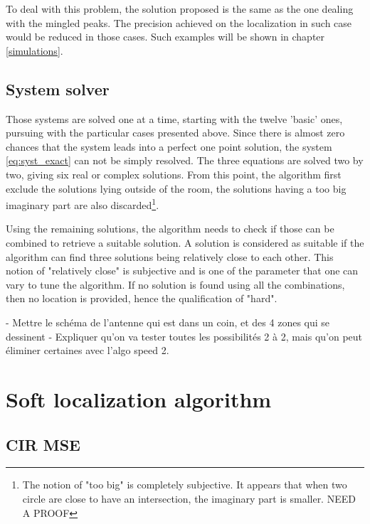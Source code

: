 To deal with this problem, the solution proposed is the same as the one dealing with the mingled peaks. The precision achieved on the localization in such case would be reduced  in those cases. Such examples will be shown in chapter \ref{simulations}.
\vspace{2mm}

\subsection{System solver}

Those systems are solved one at a time, starting with the twelve 'basic' ones, pursuing with the particular cases presented above. Since there is almost zero chances that the system leads into a perfect one point solution, the system \ref{eq:syst_exact} can not be simply resolved. The three equations are solved two by two, giving six real or complex solutions. From this point, the algorithm first exclude the solutions lying outside of the room, the solutions having a too big imaginary part are also discarded\footnote{The notion of "too big" is completely subjective. It appears that when two circle are close to have an intersection, the imaginary part is smaller. \color{red} NEED A PROOF \color{black}}. 
\vspace{2mm}

Using the remaining solutions, the algorithm needs to check if those can be combined to retrieve a suitable solution. A solution is considered as suitable if the algorithm can find three solutions being relatively close to each other. This notion of "relatively close" is subjective and is one of the parameter that one can vary to tune the algorithm. If no solution is found using all the combinations, then no location is provided, hence the qualification of "hard".
\vspace{2mm}

- Mettre le schéma de l'antenne qui est dans un coin, et des 4 zones qui se dessinent
- Expliquer qu'on va tester toutes les possibilités 2 à 2, mais qu'on peut éliminer certaines avec l'algo speed 2.

\section{Soft localization algorithm}
\label{soft_loc}

\subsection{CIR MSE}

